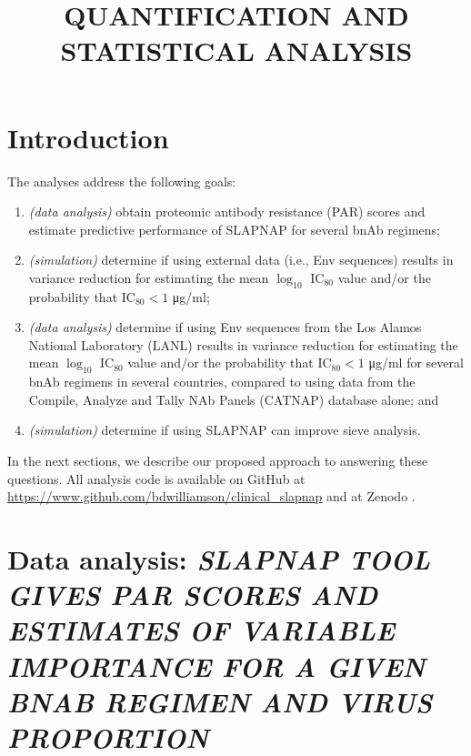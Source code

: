 \documentclass[10pt]{article}
\author{}
\title{\textbf{QUANTIFICATION AND STATISTICAL ANALYSIS}}
\date{}
\begin{document}
\maketitle

\section{Introduction}


The analyses address the following goals:
\begin{enumerate}
    \item \textit{(data analysis)} obtain proteomic antibody resistance (PAR) scores and estimate predictive performance of SLAPNAP \citep{williamson2021} for several bnAb regimens;
    \item \textit{(simulation)} determine if using external data (i.e., Env sequences) results in variance reduction for estimating the mean $\log_{10}$ IC$_{80}$ value and/or the probability that IC$_{80} < 1$ \si{\ug}/ml;
    \item \textit{(data analysis)} determine if using Env sequences from the Los Alamos National Laboratory (LANL) results in variance reduction for estimating the mean $\log_{10}$ IC$_{80}$ value and/or the probability that IC$_{80} < 1$ \si{\ug}/ml for several bnAb regimens in several countries, compared to using data from the Compile, Analyze and Tally NAb Panels (CATNAP) database \citep{yoon2015} alone; and
    \item \textit{(simulation)} determine if using SLAPNAP can improve sieve analysis.
\end{enumerate}
In the next sections, we describe our proposed approach to answering these questions. All analysis code is available on GitHub at \url{https://www.github.com/bdwilliamson/clinical\_slapnap} and at Zenodo \citep{williamson2022}.

\section{Data analysis: \textit{SLAPNAP TOOL GIVES PAR SCORES AND ESTIMATES OF VARIABLE IMPORTANCE FOR A GIVEN BNAB REGIMEN AND VIRUS PROPORTION}}\label{sec:par_scores}
\end{document}
